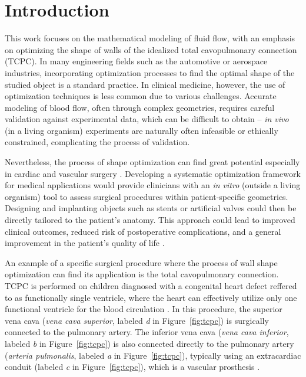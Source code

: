 \chapter*{Introduction}


This work focuses on the mathematical modeling of fluid flow, with an emphasis on optimizing the shape of walls of the idealized total cavopulmonary connection (TCPC). In many engineering fields such as the automotive or aerospace industries, incorporating optimization processes to find the optimal shape of the studied object is a standard practice. In clinical medicine, however, the use of optimization techniques  is less common due to various challenges. Accurate modeling of blood flow, often through complex geometries, requires careful validation against experimental data, which can be difficult to obtain -- \textit{in vivo} (in a living organism) experiments are naturally often infeasible or ethically constrained, complicating the process of validation.

Nevertheless, the process of shape optimization can find great potential especially in cardiac and vascular surgery \cite{Abraham2005, Weddell2015, Marsden2008}. Developing a systematic optimization framework for medical applications would provide clinicians with an \textit{in vitro} (outside a living organism) tool to assess surgical procedures within patient-specific geometries. Designing and implanting objects such as stents or artificial valves could then be directly tailored to the patient's anatomy. This approach could lead to improved clinical outcomes, reduced risk of postoperative complications, and a general improvement in the patient's quality of life \cite{Marsden2008}.

An example of a specific surgical procedure where the process of wall shape optimization can find its application is the total cavopulmonary connection. TCPC is performed on children diagnosed with a congenital heart defect reffered to as functionally single ventricle, where  the heart can effectively utilize only one functional ventricle for the blood circulation \cite{Chaloup}. In this procedure, the superior vena cava (\textit{vena cava superior}, labeled \textit{d} in Figure~\ref{fig:tcpc}) is surgically connected to the pulmonary artery. The inferior vena cava (\textit{vena cava inferior}, labeled \textit{b} in Figure~\ref{fig:tcpc}) is also connected directly to the pulmonary artery (\textit{arteria pulmonalis}, labeled \textit{a} in Figure~\ref{fig:tcpc}), typically using an extracardiac conduit (labeled \textit{c} in Figure~\ref{fig:tcpc}), which is a vascular prosthesis \cite{Rubtsova, Delorme}.

